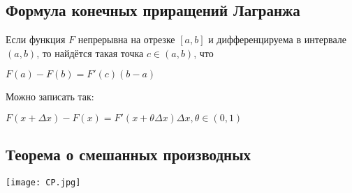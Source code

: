 \documentclass{article}
\begin{document}
\subsection*{Формула конечных приращений Лагранжа}\label{eq5}	
Если функция $F$ непрерывна на отрезке $[a,b]$  и дифференцируема в интервале $(a,b)$, то найдётся такая точка $ c\in (a,b)$, что
 
	$F(a) - F(b) = F'(c)(b - a)$
	
	Можно записать так:
	
	$F(x + \Delta x) - F(x) = F'(x + \theta\Delta x)\Delta x , \theta \in (0,1) $

\subsection*{Теорема о смешанных производных}\label{eq6}
\texttt{[image: CP.jpg]}	
\end{document}
